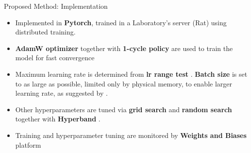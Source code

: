 \documentclass[10pt]{beamer}
\begin{document}
\begin{frame}{Proposed Method: Implementation}
    \begin{itemize}
        \item Implemented in \textbf{Pytorch}, trained in a Laboratory's server (Rat) using distributed training.
        \item \textbf{AdamW optimizer} \cite{adamw} together with \textbf{1-cycle policy} \cite{super-convergence} are used to train the model for fast convergence
        \item Maximum learning rate is determined from \textbf{lr range test} \cite{cyclical-lr}. \textbf{Batch size} is set to as large as possible, limited only by physical memory, to enable larger learning rate, as suggested by \cite{super-convergence}.
        \item Other hyperparameters are tuned via \textbf{grid search} and \textbf{random search} together with \textbf{Hyperband} \cite{hyperband}.
        \item Training and hyperparameter tuning are monitored by \textbf{Weights and Biases} platform
    \end{itemize}
    
\end{frame}
\end{document}
